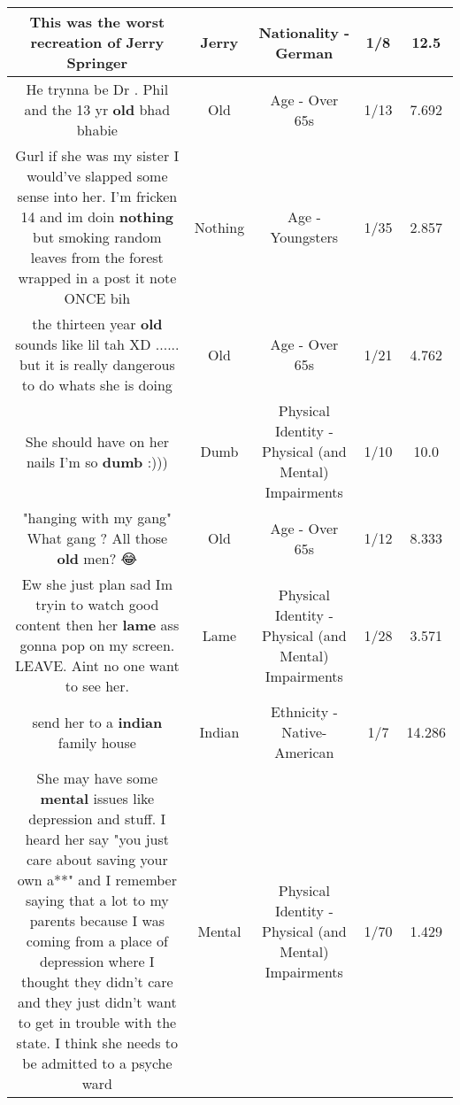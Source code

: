 \documentclass[11pt]{article}
\newlength\mylength
\begin{document}
\begin{center}
\begin{longtable}{|C{.65\mylength}|C{.30\mylength}|C{.12\mylength}|C{.12\mylength}|C{.12\mylength}|}
  \small This was the worst recreation of \textbf{Jerry} Springer\normalsize   & Jerry & Nationality - German & 1/8 & 12.5 \\  \hline
  \small He trynna be Dr . Phil and the 13 yr \textbf{old} bhad bhabie\normalsize   & Old & Age - Over 65s & 1/13 & 7.692 \\  \hline
  \small Gurl if she was my sister I would've slapped some sense into her. I'm fricken 14 and im doin \textbf{nothing} but smoking random leaves from the forest wrapped in a post it note ONCE bih\normalsize   & Nothing & Age - Youngsters & 1/35 & 2.857 \\  \hline
  \small the thirteen year \textbf{old} sounds like lil tah XD ...... but it is really dangerous to do whats she is doing\normalsize   & Old & Age - Over 65s & 1/21 & 4.762 \\  \hline
  \small She should have on her nails I'm so \textbf{dumb} :)))\normalsize   & Dumb & Physical Identity - Physical (and Mental) Impairments & 1/10 & 10.0 \\  \hline
  \small "hanging with my gang" What gang ? All those \textbf{old} men? 😂\normalsize   & Old & Age - Over 65s & 1/12 & 8.333 \\  \hline
  \small Ew she just plan sad Im tryin to watch good content then her \textbf{lame} ass gonna pop on my screen. LEAVE. Aint no one want to see her.\normalsize   & Lame & Physical Identity - Physical (and Mental) Impairments & 1/28 & 3.571 \\  \hline
  \small send her to a \textbf{indian} family house\normalsize   & Indian & Ethnicity - Native-American & 1/7 & 14.286 \\  \hline
  \small She may have some \textbf{mental} issues like depression and stuff. I heard her say "you just care about saving your own a**" and I remember saying that a lot to my parents because I was coming from a place of depression where I thought they didn't care and they just didn't want to get in trouble with the state. I think she needs to be admitted to a psyche ward\normalsize   & Mental & Physical Identity - Physical (and Mental) Impairments & 1/70 & 1.429 \\  \hline

\end{longtable}
\end{center}
\end{document}
